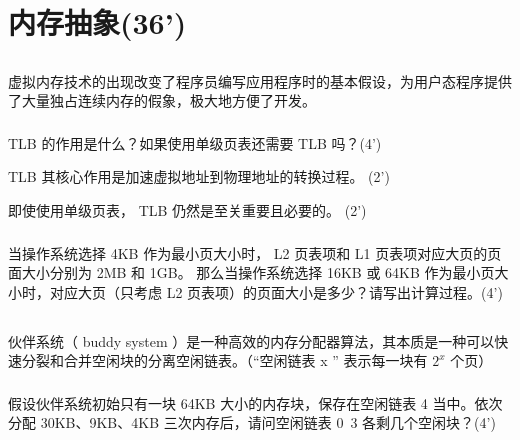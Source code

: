 \documentclass[a4paper,12pt]{article}
\newcommand{\score}[1]{(#1')}
\begin{document}
\section{内存抽象\score{36}}

\subsection{}

虚拟内存技术的出现改变了程序员编写应用程序时的基本假设，为用户态程序提供了大量独占连续内存的假象，极大地方便了开发。

\subsubsection{}

TLB 的作用是什么？如果使用单级页表还需要 TLB 吗？\score{4}

\begin{answer}
  TLB 其核心作用是​​加速虚拟地址到物理地址的转换过程。 \score{2}

  即使使用单级页表， TLB 仍然是至关重要且必要的。 \score{2}
\end{answer}

\subsubsection{}

当操作系统选择 4KB 作为最小页大小时， L2 页表项和 L1 页表项对应大页的页面大小分别为 2MB 和 1GB。
那么当操作系统选择 16KB 或 64KB 作为最小页大小时，对应大页（只考虑 L2 页表项）的页面大小是多少？请写出计算过程。\score{4}

\begin{answer}
  \lipsum[3]
\end{answer}

\subsection{}

伙伴系统（ buddy system ）是一种高效的内存分配器算法，其本质是一种可以快速分裂和合并空闲块的分离空闲链表。（“空闲链表 x ” 表示每一块有 $2^{x}$ 个页）

\subsubsection{}

假设伙伴系统初始只有一块 64KB 大小的内存块，保存在空闲链表 4 当中。依次分配 30KB、9KB、4KB 三次内存后，请问空闲链表 0~3 各剩几个空闲块？\score{4}
\end{document}
